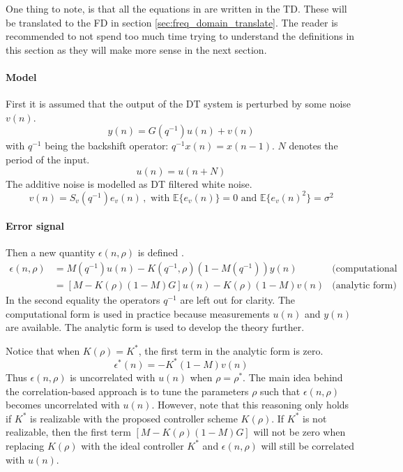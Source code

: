 One thing to note, is that all the equations in \cite{Data-driven_model_reference_control} are written in the TD. These will be translated to the FD in section \ref{sec:freq_domain_translate}. The reader is recommended to not spend too much time trying to understand the definitions in this section as they will make more sense in the next section.

\paragraph{Model}
First it is assumed that the output of the DT system is perturbed by some noise $v(n)$.
\begin{equation}
    y(n) = G(q^{-1}) u(n) + v(n)
    \label{eq:model_TD}
\end{equation}
with $q^{-1}$ being the backshift operator: $q^{-1} x(n) = x(n-1)$. $N$ denotes the period of the input.
\begin{equation}
    u(n) = u(n+N)
    \label{eq:periodicity_u}
\end{equation}
The additive noise is modelled as DT filtered white noise.
\begin{equation*}
    v(n) = S_v(q^{-1}) e_v(n) \,, \text{ with } \mathbb{E}\{e_v(n)\} = 0 \text{ and } \mathbb{E}\{e_v(n)^2\} = \sigma^2
\end{equation*}

\paragraph{Error signal}
Then a new quantity $\epsilon(n,\rho)$ is defined \cite[eq. (15)]{Data-driven_model_reference_control}.
\begin{align*}
    \epsilon(n,\rho) &= M(q^{-1}) u(n) - K(q^{-1},\rho) (1-M(q^{-1})) y(n) & \text{(computational form)} \\
    &= [M-K(\rho) (1-M) G ] u(n) - K(\rho) (1-M) v(n) & \text{(analytic form)} 
\end{align*}
In the second equality the operators $q^{-1}$ are left out for clarity. The computational form is used in practice because measurements $u(n)$ and $y(n)$ are available. The analytic form is used to develop the theory further.

Notice that when $K(\rho) = K^*$, the first term in the analytic form is zero.
\begin{equation*}
	\epsilon^*(n) = -K^*(1-M)v(n)
\end{equation*}
Thus $\epsilon(n,\rho)$ is uncorrelated with $u(n)$ when $\rho = \rho^*$. The main idea behind the correlation-based approach is to tune the parameters $\rho$ such that $\epsilon(n,\rho)$ becomes uncorrelated with $u(n)$. However, note that this reasoning only holds if $K^*$ is realizable with the proposed controller scheme $K(\rho)$. If $K^*$ is not realizable, then the first term $[M-K(\rho) (1-M) G ]$ will not be zero when replacing $K(\rho)$ with the ideal controller $K^*$ and $\epsilon(n,\rho)$ will still be correlated with $u(n)$.


